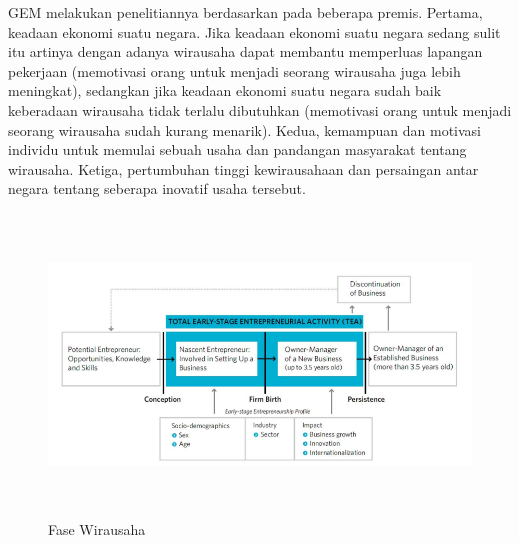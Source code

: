 GEM melakukan penelitiannya berdasarkan pada beberapa premis. Pertama, keadaan ekonomi suatu negara. Jika keadaan ekonomi suatu negara sedang sulit itu artinya dengan adanya wirausaha dapat membantu memperluas lapangan pekerjaan (memotivasi orang untuk menjadi seorang wirausaha juga lebih meningkat), sedangkan jika keadaan ekonomi suatu negara sudah baik keberadaan wirausaha tidak terlalu dibutuhkan (memotivasi orang untuk menjadi seorang wirausaha sudah kurang menarik). Kedua, kemampuan dan motivasi individu untuk memulai sebuah usaha dan pandangan masyarakat tentang wirausaha. Ketiga, pertumbuhan tinggi kewirausahaan dan persaingan antar negara tentang seberapa inovatif usaha tersebut. \cite{GEM2013}
\begin{figure} [H]
	\centering  
	\includegraphics[width=14cm, height=8cm]{faseWirausaha}  
	\caption[Fase Wirausaha]{Fase Wirausaha} 
	\label{fig:fasewirausaha} 
\end{figure}


